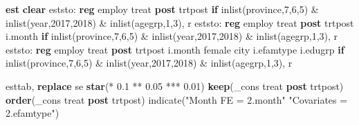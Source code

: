 \documentclass[
  letterpaper,
  DIV=11,
  numbers=noendperiod]{scrartcl}
\newenvironment{Shaded}{\begin{snugshade}}{\end{snugshade}}
\newcommand{\DataTypeTok}[1]{\textcolor[rgb]{0.68,0.00,0.00}{#1}}
\newcommand{\FunctionTok}[1]{\textcolor[rgb]{0.28,0.35,0.67}{#1}}
\newcommand{\KeywordTok}[1]{\textcolor[rgb]{0.00,0.23,0.31}{\textbf{#1}}}
\newcommand{\NormalTok}[1]{\textcolor[rgb]{0.00,0.23,0.31}{#1}}
\newcommand{\StringTok}[1]{\textcolor[rgb]{0.13,0.47,0.30}{#1}}
\begin{document}
\begin{Shaded}
\begin{Highlighting}[]
\KeywordTok{est} \KeywordTok{clear}
\NormalTok{eststo: }\KeywordTok{reg}\NormalTok{ employ treat }\KeywordTok{post}\NormalTok{ trtpost }\KeywordTok{if} \FunctionTok{inlist}\NormalTok{(province,7,6,5) \& }\FunctionTok{inlist}\NormalTok{(}\FunctionTok{year}\NormalTok{,2017,2018) \& }\FunctionTok{inlist}\NormalTok{(agegrp,1,3), }\FunctionTok{r}
\NormalTok{eststo: }\KeywordTok{reg}\NormalTok{ employ treat }\KeywordTok{post}\NormalTok{ trtpost i.}\FunctionTok{month} \KeywordTok{if} \FunctionTok{inlist}\NormalTok{(province,7,6,5) \& }\FunctionTok{inlist}\NormalTok{(}\FunctionTok{year}\NormalTok{,2017,2018) \& }\FunctionTok{inlist}\NormalTok{(agegrp,1,3), }\FunctionTok{r}
\NormalTok{eststo: }\KeywordTok{reg}\NormalTok{ employ treat }\KeywordTok{post}\NormalTok{ trtpost i.}\FunctionTok{month}\NormalTok{ female city i.efamtype i.edugrp }\KeywordTok{if} \FunctionTok{inlist}\NormalTok{(province,7,6,5) \& }\FunctionTok{inlist}\NormalTok{(}\FunctionTok{year}\NormalTok{,2017,2018) \& }\FunctionTok{inlist}\NormalTok{(agegrp,1,3), }\FunctionTok{r}

\NormalTok{esttab, }\KeywordTok{replace}\NormalTok{ se }\KeywordTok{star}\NormalTok{(* 0.1 ** 0.05 *** 0.01) }\KeywordTok{keep}\NormalTok{(}\DataTypeTok{\_cons}\NormalTok{ treat }\KeywordTok{post}\NormalTok{ trtpost) }\KeywordTok{order}\NormalTok{(}\DataTypeTok{\_cons}\NormalTok{ treat }\KeywordTok{post}\NormalTok{ trtpost) indicate(}\StringTok{"Month FE = 2.month"} \StringTok{"Covariates = 2.efamtype"}\NormalTok{) }
\end{Highlighting}
\end{Shaded}
\end{document}
